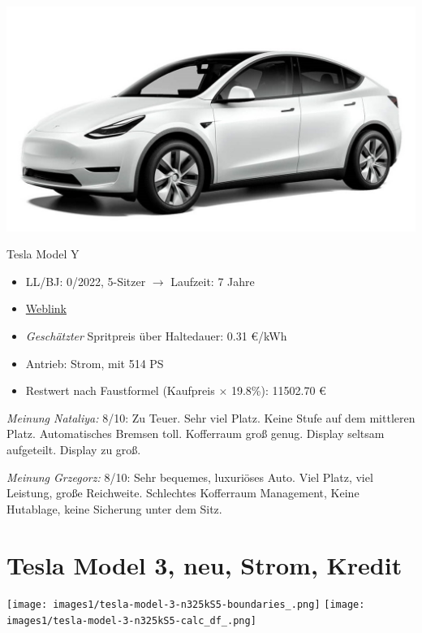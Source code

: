 \documentclass[landscape, DIV=99, 14pt]{scrartcl}
\begin{document}
\pagebreak
\begin{center}
\includegraphics[width=0.9\columnwidth]{cars/tesla-model-y.jpg}

Tesla Model Y
\end{center}

\begin{itemize}
    \item LL/BJ: 0/2022, 5-Sitzer $\rightarrow$ Laufzeit: 7 Jahre
    \item \href{https://www.tesla.com/de_de/modely/design\#overview}{Weblink}
    \item \emph{Gesch\"atzter} Spritpreis \"uber Haltedauer: 0.31 \euro{}/kWh
    \item Antrieb: Strom, mit 514 PS
    \item Restwert nach Faustformel (Kaufpreis $\times$ 19.8\%): 11502.70 \euro{}
\end{itemize}

\begin{small}
\emph{Meinung Nataliya:} 8/10: Zu Teuer. Sehr viel Platz. Keine Stufe auf dem mittleren Platz. Automatisches Bremsen toll. Kofferraum groß genug. Display seltsam aufgeteilt. Display zu groß.
        
\emph{Meinung Grzegorz:} 8/10: Sehr bequemes, luxuri\"oses Auto. Viel Platz, viel Leistung, gro\ss{}e Reichweite. Schlechtes Kofferraum Management, Keine Hutablage, keine Sicherung unter dem Sitz.
\end{small}

\pagebreak


\twocolumn

\section*{Tesla Model 3, neu, Strom, Kredit}
\begin{center}
\texttt{[image: images1/tesla-model-3-n325kS5-boundaries\_.png]}
\null
\vspace{0.5cm}
\texttt{[image: images1/tesla-model-3-n325kS5-calc\_df\_.png]}
\end{center}
\end{document}

